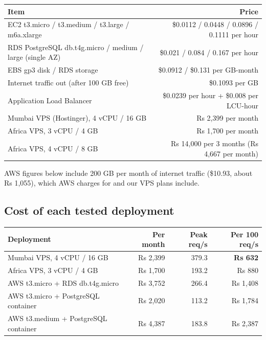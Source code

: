 \documentclass[12pt,a4paper]{article}
\begin{document}
\begin{center}
\begin{tabularx}{\linewidth}{@{}Lr@{}}
\toprule
\textbf{Item} & \textbf{Price} \\
\midrule
EC2 t3.micro / t3.medium / t3.large / m6a.xlarge & \$0.0112 / 0.0448 / 0.0896 / 0.1111 per hour \\
RDS PostgreSQL db.t4g.micro / medium / large (single AZ) & \$0.021 / 0.084 / 0.167 per hour \\
EBS gp3 disk / RDS storage & \$0.0912 / \$0.131 per GB-month \\
Internet traffic out (after 100 GB free) & \$0.1093 per GB \\
Application Load Balancer & \$0.0239 per hour + \$0.008 per LCU-hour \\
Mumbai VPS (Hostinger), 4 vCPU / 16 GB & Rs 2,399 per month \\
Africa VPS, 3 vCPU / 4 GB & Rs 1,700 per month \\
Africa VPS, 4 vCPU / 8 GB & Rs 14,000 per 3 months (Rs 4,667 per month) \\
\bottomrule
\end{tabularx}
\end{center}
AWS figures below include 200 GB per month of internet traffic (\$10.93, about Rs 1,055), which AWS
charges for and our VPS plans include.

\subsection{Cost of each tested deployment}
\begin{center}
\begin{tabularx}{\linewidth}{@{}Lrrr@{}}
\toprule
\textbf{Deployment} & \textbf{Per month} & \textbf{Peak req/s} & \textbf{Per 100 req/s} \\
\midrule
Mumbai VPS, 4 vCPU / 16 GB & Rs 2,399 & 379.3 & \textbf{Rs 632} \\
Africa VPS, 3 vCPU / 4 GB & Rs 1,700 & 193.2 & Rs 880 \\
AWS t3.micro + RDS db.t4g.micro & Rs 3,752 & 266.4 & Rs 1,408 \\
AWS t3.micro + PostgreSQL container & Rs 2,020 & 113.2 & Rs 1,784 \\
AWS t3.medium + PostgreSQL container & Rs 4,387 & 183.8 & Rs 2,387 \\
\bottomrule
\end{tabularx}
\end{center}
\end{document}
